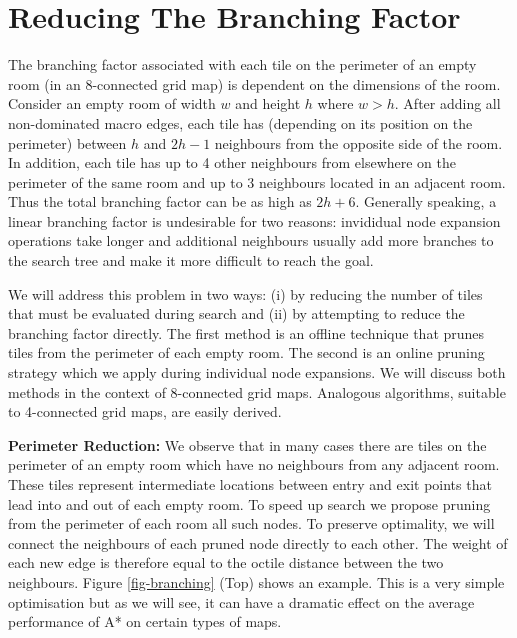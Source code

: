 \section{Reducing The Branching Factor}
The branching factor associated with each tile on the perimeter of an empty room (in an 8-connected 
grid map) is dependent on the dimensions of the room.
Consider an empty room of width $w$ and height $h$ where $w > h$.
After adding all non-dominated macro edges, each tile has (depending on its position on the perimeter) 
between $h$ and $2h - 1$ neighbours from the opposite side 
of the room. 
In addition, each tile has up to 4 other neighbours from elsewhere on the perimeter of the same room and
up to 3 neighbours located in an adjacent room.
Thus the total branching factor can be as high as $2h + 6$.
Generally speaking, a linear branching factor is undesirable for two reasons:
invididual node expansion operations take longer and additional neighbours usually 
add more branches to the search tree and make it more difficult to reach the goal.
\par
We will address this problem in two ways: (i) by reducing the number of tiles that must be evaluated during search and 
(ii) by attempting to reduce the branching factor directly.
The first method is an offline technique that prunes tiles from the perimeter of each empty room. 
The second is an online pruning strategy which we apply during individual node expansions.
We will discuss both methods in the context of 8-connected grid maps.
Analogous algorithms, suitable to 4-connected grid maps, are easily derived.
\par \noindent \newline
\textbf{Perimeter Reduction:}
We observe that in many cases there are tiles on the perimeter of an empty room which have no neighbours from any 
adjacent room. 
These tiles represent intermediate locations between entry and exit points that lead into and out of each empty room.
To speed up search we propose pruning from the perimeter of each room all such nodes.
To preserve optimality, we will connect the neighbours of each pruned node directly to each other.
The weight of each new edge is therefore equal to the octile distance between the two neighbours.
Figure \ref{fig-branching} (Top) shows an example.
This is a very simple optimisation but as we will see, it can have a dramatic effect on the average performance of
A* on certain types of maps.

